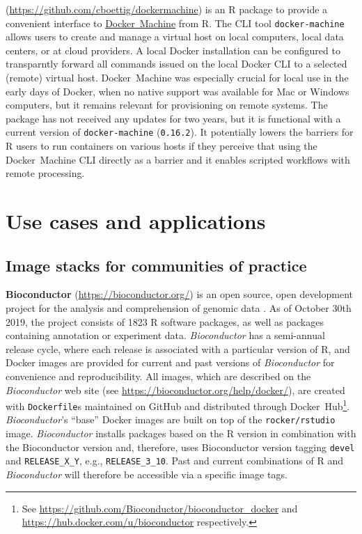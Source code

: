 \textbf{}
(\url{https://github.com/cboettig/dockermachine}) is an R package to
provide a convenient interface to
\href{https://docs.docker.com/machine/overview/}{Docker~Machine} from R.
The CLI tool \texttt{docker-machine} allows users to create and manage a
virtual host on local computers, local data centers, or at cloud
providers. A local Docker installation can be configured to transparntly
forward all commands issued on the local Docker CLI to a selected
(remote) virtual host. Docker~Machine was especially crucial for local
use in the early days of Docker, when no native support was available
for Mac or Windows computers, but it remains relevant for provisioning
on remote systems. The package has not received any updates for two
years, but it is functional with a current version of
\texttt{docker-machine} (\texttt{0.16.2}). It potentially lowers the
barriers for R users to run containers on various hosts if they perceive
that using the Docker~Machine CLI directly as a barrier and it enables
scripted workflows with remote processing.

\hypertarget{use-cases-and-applications}{%
\section{Use cases and applications}\label{use-cases-and-applications}}

\label{applications}

\hypertarget{image-stacks-for-communities-of-practice}{%
\subsection{Image stacks for communities of
practice}\label{image-stacks-for-communities-of-practice}}

\textbf{Bioconductor} (\url{https://bioconductor.org/}) is an open
source, open development project for the analysis and comprehension of
genomic data \citep{gentleman_bioconductor_2004}. As of October 30th
2019, the project consists of 1823 R software packages, as well as
packages containing annotation or experiment data. \emph{Bioconductor}
has a semi-annual release cycle, where each release is associated with a
particular version of R, and Docker images are provided for current and
past versions of \emph{Bioconductor} for convenience and
reproducibility. All images, which are described on the
\emph{Bioconductor} web site (see
\url{https://bioconductor.org/help/docker/}), are created with
\texttt{Dockerfile}s maintained on GitHub and distributed through
Docker~Hub\footnote{See \href{https://github.com/Bioconductor/bioconductor_docker}{https://github.com/Bioconductor/bioconductor\_docker} and \href{https://hub.docker.com/u/bioconductor}{https://hub.docker.com/u/bioconductor} respectively.}.
\emph{Bioconductor}'s ``base'' Docker images are built on top of the
\texttt{rocker/rstudio} image. \emph{Bioconductor} installs packages
based on the R version in combination with the Bioconductor version and,
therefore, uses Bioconductor version tagging \texttt{devel} and
\texttt{RELEASE\_X\_Y}, e.g., \texttt{RELEASE\_3\_10}. Past and current
combinations of R and \emph{Bioconductor} will therefore be accessible
via a specific image tags.

